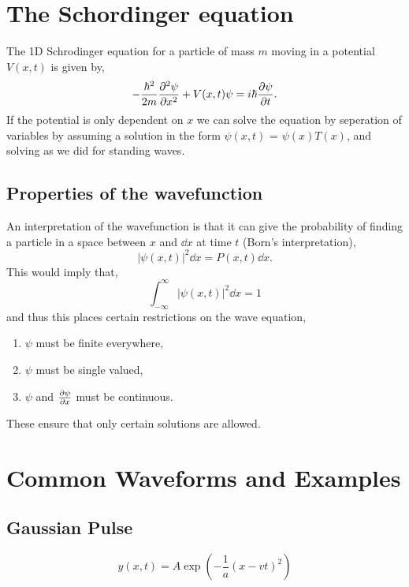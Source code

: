 \documentclass{book}
\begin{document}
\chapter{The Schordinger equation}
The 1D Schrodinger equation for a particle of mass $m$ moving in a potential $V(x,t)$ is given by,
\begin{equation}
	-\frac{\hbar^2}{2m}\pdv[2]{\psi}{x} + V(x,t)\psi = i\hbar \pdv{\psi}{t}.
\end{equation}
If the potential is only dependent on $x$ we can solve the equation by seperation of variables by assuming a solution in the form $\psi(x,t)$ = $\psi(x)T(x)$, and solving as we did for standing waves.
\section{Properties of the wavefunction}
An interpretation of the wavefunction is that it can give the probability of finding a particle in a space between $x$ and $\dd{x}$ at time $t$ (Born's interpretation),
\begin{equation}
	|\psi(x,t)|^2\dd{x}= P(x,t)\dd{x}.
\end{equation}
This would imply that,
\begin{equation}
	\int_{-\infty}^{\infty}|\psi(x,t)|^2\dd{x} = 1
\end{equation}
and thus this places certain restrictions on the wave equation,
\begin{enumerate}
	\item $\psi$ must be finite everywhere,
	\item $\psi$ must be single valued,
	\item $\psi$ and $\pdv{\psi}{x}$ must be continuous. 
\end{enumerate}
These ensure that only certain solutions are allowed.
\appendix
\chapter{Common Waveforms and Examples}
\section{Gaussian Pulse}
\begin{equation}
    y(x,t) = A\exp\left(-\frac{1}{a}(x-vt)^2\right)
\end{equation}
\end{document}
